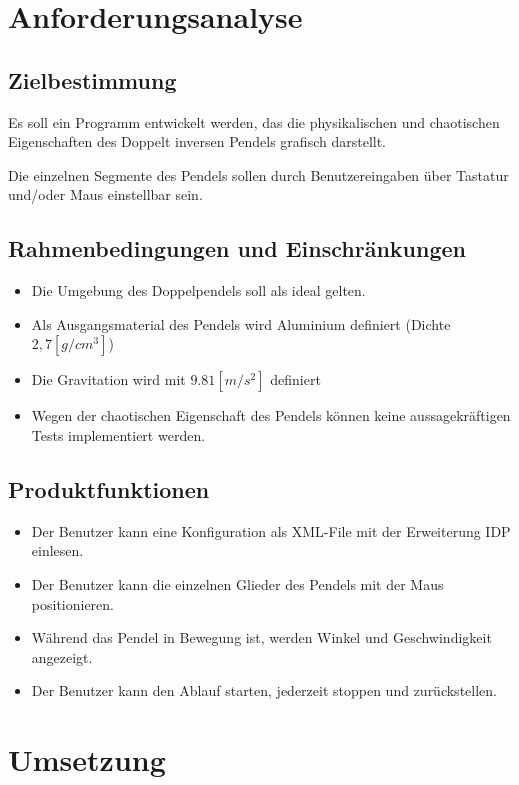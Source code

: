 \documentclass[12pt]{article}
\numberwithin{equation}{subsection}
\begin{document}
\newpage
\section{Anforderungsanalyse}
\subsection{Zielbestimmung}
Es soll ein Programm entwickelt werden, das die physikalischen und chaotischen Eigenschaften des Doppelt inversen Pendels grafisch darstellt.

Die einzelnen Segmente des Pendels sollen durch Benutzereingaben über Tastatur und/oder Maus einstellbar sein.

\subsection{Rahmenbedingungen und Einschränkungen}
\begin{itemize}
	\item Die Umgebung des Doppelpendels soll als ideal gelten.
	\item Als Ausgangsmaterial des Pendels wird Aluminium definiert (Dichte $2,7 [g/cm^3]$)
	\item Die Gravitation wird mit $9.81 [m/s^2]$ definiert
	\item Wegen der chaotischen Eigenschaft des Pendels können keine aussagekräftigen Tests implementiert werden.
\end{itemize}

\subsection{Produktfunktionen}
\begin{itemize}
	\item Der Benutzer kann eine Konfiguration als XML-File mit der Erweiterung IDP einlesen.
	\item Der Benutzer kann die einzelnen Glieder des Pendels mit der Maus positionieren.
	\item Während das Pendel in Bewegung ist, werden Winkel und Geschwindigkeit angezeigt.
	\item Der Benutzer kann den Ablauf starten, jederzeit stoppen und zurückstellen.
\end{itemize}


\newpage
\section{Umsetzung}
\end{document}
